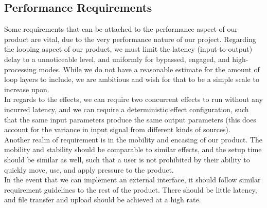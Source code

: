 \subsection{Performance Requirements}
Some requirements that can be attached to the performance aspect of our product are vital, due to the very performance nature of our project. Regarding the looping aspect of our product, we must limit the latency (input-to-output) delay to a unnoticeable level, and uniformly for bypassed, engaged, and high-processing modes. While we do not have a reasonable estimate for the amount of loop layers to include, we are ambitious and wish for that to be a simple scale to increase upon. \\
In regards to the effects, we can require two concurrent effects to run without any incurred latency, and we can require a deterministic effect configuration, such that the same input parameters produce the same output parameters (this does account for the variance in input signal from different kinds of sources). \\
Another realm of requirement is in the mobility and encasing of our product. The mobility and stability should be comparable to similar effects, and the setup time should be similar as well, such that a user is not prohibited by their ability to quickly move, use, and apply pressure to the product. \\
In the event that we can implement an external interface, it should follow similar requirement guidelines to the rest of the product. There should be little latency, and file transfer and upload should be achieved at a high rate. 
    
    

